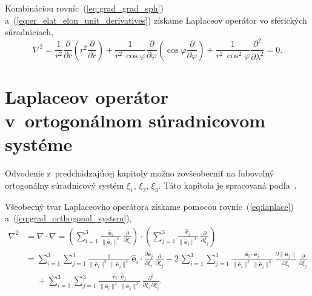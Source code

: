 \documentclass[a4paper,12pt]{book}
\let\vec\mathbf
\begin{document}
%
Kombináciou rovníc~(\ref{eq:grad_grad_sph}) 
a~(\ref{eq:er_elat_elon_unit_derivatives}) získame Laplaceov operátor vo 
sférických súradniciach,
%
\begin{equation}
\nabla^2 = \frac{1}{r^2} \frac{\partial}{\partial r} \left( r^2
\frac{\partial}{\partial r} \right) + \frac{1}{r^2 \, \cos\varphi}
\frac{\partial}{\partial \varphi} \left( \cos\varphi \frac{\partial}{\partial 
\varphi} \right) + \frac{1}{r^2 \,
\cos^2\varphi}\frac{\partial^2}{\partial \lambda^2} = 0{.}
\end{equation}



\section{Laplaceov operátor v~ortogonálnom súradnicovom systéme}
\label{app:laplace_in_orthogonal_coordinates}

Odvodenie z~predchádzajúcej kapitoly možno zovšeobecniť na ľubovoľný 
ortogonálny súradnicový systém $\xi_1$, $\xi_2$, $\xi_3$.  Táto kapitola je 
spracovaná podľa~\textcite{SansoGeoidDetermination}.

Všeobecný tvar Laplaceovho operátora získame pomocou rovníc~(\ref{eq:laplace}) 
a~(\ref{eq:grad_orthogonal_system}),
%
\begin{equation}
\label{eq:laplace_orthogonal_system_1}
\begin{split}
\nabla^2 &= \nabla \cdot \nabla = \left( \sum_{i = 1}^3 \frac{\hat{\vec 
e}_i}{\| \hat{\vec e}_i \|^2} \, \frac{\partial}{\partial \xi_i}\right) \cdot 
\left( \sum_{j = 1}^3 \frac{\hat{\vec e}_j}{\| \hat{\vec e}_j \|^2} \, 
\frac{\partial}{\partial \xi_j}
\right)\\
%
&= \sum_{i = 1}^{3} \sum_{j = 1}^3 \frac{1}{\| \hat{\vec e}_i \|^2 \, \| 
\hat{\vec e}_j \|^2} \, \hat{\vec e}_i \cdot \frac{\partial \hat{\vec 
e}_j}{\partial \xi_i} \, \frac{\partial}{\partial \xi_j}
- 2\, \sum_{i = 1}^{3} \sum_{j = 1}^3 \frac{\hat{\vec e}_i \cdot \hat{\vec 
e}_j}{\| \hat{\vec e}_i \|^2 \, \|\hat{\vec e}_j \|^3} \, \frac{\partial \| 
\hat{\vec e}_j \|}{\partial \xi_i} \, \frac{\partial}{\partial \xi_j}\\
%
&\phantom{={}}+ \sum_{i = 1}^{3} \sum_{j = 1}^3 \frac{\hat{\vec e}_i \cdot 
\hat{\vec e}_j}{\| \hat{\vec e}_i \|^2 \, \| \hat{\vec e}_j \|^2} \, 
\frac{\partial^2}{\partial \xi_i \, \partial \xi_j}{.}
\end{split}
%
\end{equation}
\end{document}
